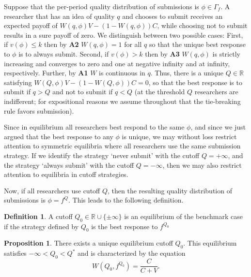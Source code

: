 \documentclass[12pt]{article}
\theoremstyle{plain}
\theoremstyle{definition}
\newtheorem{definition}{Definition}
\newtheorem{proposition}{Proposition}
\theoremstyle{remark}
\def\RR{\mathbb{R}}
\begin{document}
Suppose that the per-period quality distribution of submissions is $\phi\in \Gamma_f$. A researcher that has an idea of quality $q$ and chooses to submit receives an expected payoff of $W(q,\phi)V-(1-W(q,\phi))C$, while choosing not to submit results in a sure payoff of zero. We distinguish between two possible cases: First, if $v(\phi)\le k$ then by \textbf{A2} $W(q,\phi)=1$ for all $q$ so that the unique best response to $\phi$ is to always submit. Second, if $v(\phi)>k$ then by \textbf{A3} $W(q,\phi)$ is strictly increasing and converges to zero and one at negative infinity and at infinity, respectively. Further, by \textbf{A1} $W$ is continuous in $q$. Thus, there is a unique $Q\in \RR$ satisfying $W(Q,\phi)V-(1-W(Q,\phi))C= 0$, so that the best response is to submit if $q>Q$ and not to submit if $q<Q$ (at the threshold $Q$ researchers are indifferent; for expositional reasons we assume throughout that the tie-breaking rule favors submission). 

Since in equilibrium all researchers best respond to the same $\phi$, and since we just argued that the best response to any $\phi$ is unique, we may without loss restrict attention to symmetric equilibria where all researchers use the same submission strategy. If we identify the strategy `never submit' with the cutoff $Q=+\infty$, and the strategy `always submit' with the cutoff $Q=-\infty$, then we may also restrict attention to equilibria in cutoff strategies.

Now, if all researchers use cutoff $Q$, then the resulting quality distribution of submissions is $\phi=f^Q$. This leads to the following definition.

\begin{definition}\label{def-benchmark-eq}
A cutoff $Q_0\in \RR \cup \{\pm \infty\}$ is an equilibrium of the benchmark case if the strategy defined by $Q_0$ is the best response to $f^{Q_0}$ 
\end{definition}


\begin{proposition}\label{prop-benchmark}
There exists a unique equilibrium cutoff $Q_0$. This equilibrium satisfies $-\infty< Q_0< Q^*$ and is characterized by the equation 
\begin{equation}\label{eqn-benchmark}
    W(Q_0,f^{Q_0})=\frac{C}{C+V}. 
\end{equation} 
\end{proposition}
\end{document}
